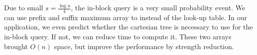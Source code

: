 \iffalse
運行區間查找時，一般依賴內建函數在 $O(1)$ 時間完成對數取整，
然而，在 VGLCS 這類型的動態規劃中，區間查找的對數結果是可以被預測的，預先將每一組詢問的區段對數結果儲存在陣列中，便可降低指令次數。
\fi

\iffalse
由於已知所有詢問區間，建立稀疏表時，可藉由動態規劃在 $O(n \log n)$ 排除掉不可能的計算 (參照算法 ~\ref{alg:reduce-boundary})，
降低過程中的計算量。由於 VGLCS 在平行操作需要 $O(n \log n)$，故使用動態規劃不影響我們的最終結果。
\fi



Due to small $s = \frac{\log n}{4}$, the in-block query is a very
small probability event.  We can use prefix and suffix maximum array
to instead of the look-up table.  In our application, we even predict
whether the cartesian tree is necessary to use for the in-block query.
If not, we can reduce time to compute it.  These two arrays brought
$O(n)$ space, but improve the performance by strength reduction.

\iffalse
從機率分佈的角度來看，因 $s = \frac{1}{4} \log n$ 過小，區間詢問完全落於 block 的機率低，
故額外維護區段前綴和後綴最大值 (prefix/suffix maximum value in block) 取代笛卡爾樹的建立。
藉這兩個額外儲存空間，將會增加空間複雜度的常數，卻能有效地降低整體的指令次數。
\fi
